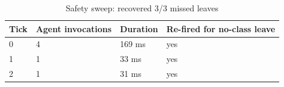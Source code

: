 \begin{table}[t]
\centering
\small
\begin{tabular}{llll}
\toprule
Tick & Agent invocations & Duration & Re-fired for no-class leave \\
\midrule
0 & 4 & 169 ms & yes \\
1 & 1 & 33 ms & yes \\
2 & 1 & 31 ms & yes \\
\bottomrule
\end{tabular}
\caption{Safety sweep: recovered 3/3 missed leaves}
\label{tab:t11-sweep}
\end{table}

